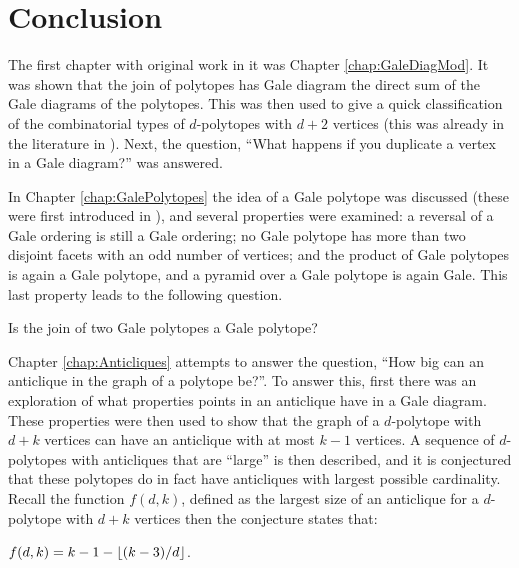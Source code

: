 \chapter{Conclusion}\label{chap:Conclusion}

The first chapter with original work in it was Chapter \ref{chap:GaleDiagMod}.  It was shown that the join of polytopes has Gale diagram the direct sum of the Gale diagrams of the polytopes.  This was then used to give a quick classification of the combinatorial types of \(d\)-polytopes  with \(d+2\) vertices (this was already in the literature in \cite{McMullenBook}).  Next, the question, ``What happens if you duplicate a vertex in a Gale diagram?'' was answered.

In Chapter \ref{chap:GalePolytopes} the idea of a Gale polytope was discussed (these were first introduced in \cite{BayerBisz}), and several properties were examined: a reversal of a Gale ordering is still a Gale ordering; no Gale polytope has more than two disjoint facets with an odd  number of vertices; and the product of Gale polytopes is again a Gale polytope, and a pyramid over a Gale polytope is again Gale.  This last property leads to the following question.
\begin{Question}
    Is the join of two Gale polytopes a Gale polytope?
\end{Question}

Chapter \ref{chap:Anticliques} attempts to answer the question, ``How big can an anticlique in the graph of a polytope be?''.  To answer this, first there was an exploration of what properties points in an anticlique have in a Gale diagram.  These properties were then used to show that the graph of a \(d\)-polytope with \(d+k\) vertices can have an anticlique with at most \(k-1\) vertices.  A sequence of \(d\)-polytopes with anticliques that are ``large'' is then described, and it is conjectured that these polytopes do in fact have anticliques with largest possible cardinality.  Recall the function \(f(d,k)\), defined as the largest size of an anticlique for a \(d\)-polytope with \(d+k\) vertices then the conjecture states that:
    \begin{Conjecture}
        \(f(d,k)=k-1-\left\lfloor(k-3)/d\right\rfloor\).
    \end{Conjecture}

